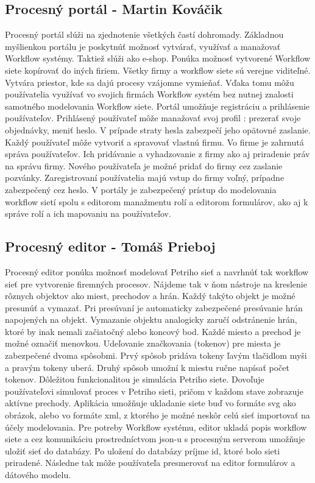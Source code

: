 \subsection{Procesný portál - Martin Kováčik}
Procesný portál slúži na zjednotenie všetkých častí dohromady. Základnou myšlienkou portálu je poskytnúť možnosť vytvárať, využívať a manažovať Workflow systémy. Taktiež slúži ako e-shop. Ponúka možnosť vytvorené Workflow siete kopírovať do iných firiem. Všetky firmy a workflow siete sú verejne viditeľné. Vytvára priestor, kde sa dajú procesy vzájomne vymieňať. Vďaka tomu môžu používatelia využívať vo svojich firmách Workflow systém bez nutnej znalosti samotného modelovania Workflow siete. Portál umožňuje registráciu a prihlásenie používateľov. Prihlásený používateľ  môže manažovať svoj profil : prezerať svoje objednávky, meniť heslo. V prípade straty hesla zabezpečí jeho opätovné zaslanie. Každý používateľ môže vytvoriť a spravovať vlastnú firmu. Vo firme je zahrnutá správa používateľov. Ich pridávanie a vyhadzovanie z firmy ako aj priradenie práv na správu firmy. Nového používateľa je možné pridať do firmy cez zaslanie pozvánky. Zaregistrovaní používatelia majú vstup do firmy voľný, prípadne zabezpečený cez heslo.  V portály je zabezpečený prístup do modelovania workflow sietí spolu s editorom manažmentu rolí a editorom formulárov, ako aj k správe rolí a ich mapovaniu na používateľov. 

\subsection{Procesný editor - Tomáš Prieboj}
Procesný editor ponúka možnosť modelovať Petriho sieť a navrhnúť tak workflow sieť pre vytvorenie firemných procesov. Nájdeme tak v ňom nástroje na kreslenie rôznych objektov ako miest, prechodov a hrán. Každý takýto objekt je možné presunúť a vymazať. Pri presúvaní je automaticky zabezpečené presúvanie hrán napojených na objekt. Vymazanie objektu analogicky zaručí odstránenie hrán, ktoré by inak nemali začiatočný alebo koncový bod. Každé miesto a prechod je možné označiť menovkou. Udeľovanie značkovania (tokenov) pre miesta je zabezpečené dvoma spôsobmi. Prvý spôsob pridáva tokeny ľavým tlačidlom myši a  pravým tokeny uberá. Druhý spôsob umožní k miestu ručne napísať počet tokenov. Dôležitou funkcionalitou je simulácia Petriho siete. Dovoľuje používateľovi simulovať proces v Petriho sieti, pričom v každom stave zobrazuje aktívne prechody. Aplikácia umožňuje ukladanie siete buď vo formáte svg ako obrázok, alebo vo formáte xml, z ktorého je možné neskôr celú sieť importovať na účely modelovania. Pre potreby Workflow systému, editor ukladá popis workflow siete a cez komunikáciu prostredníctvom json-u s procesným serverom umožňuje uložiť sieť do databázy. Po uložení do databázy príjme id, ktoré bolo sieti priradené. Následne tak môže používateľa presmerovať na editor formulárov a dátového modelu.

